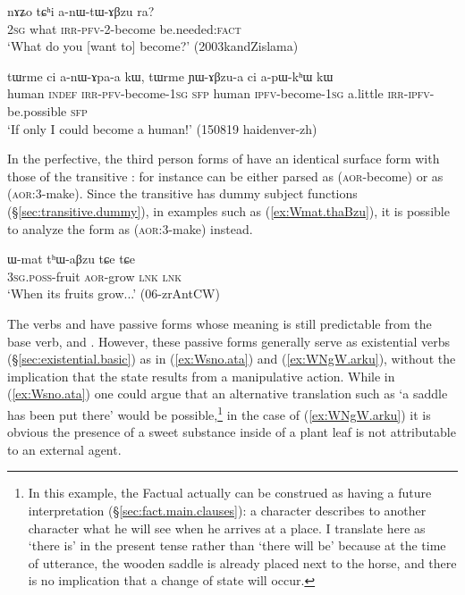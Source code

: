  \begin{exe}
\ex \label{ex:anWtABzu}
 \gll nɤʑo tɕʰi a-nɯ-tɯ-ɤβzu ra? \\
 \textsc{2sg} what \textsc{irr}-\textsc{pfv}-2-become be.needed:\textsc{fact} \\
 \glt `What do you [want to] become?' (2003kandZislama)
\end{exe}

 \begin{exe}
\ex \label{ex:anApa}
 \gll tɯrme ci a-nɯ-ɤpa-a kɯ, tɯrme ɲɯ-ɤβzu-a ci a-pɯ-kʰɯ kɯ \\
 human \textsc{indef} \textsc{irr}-\textsc{pfv}-become-\textsc{1sg} \textsc{sfp} human \textsc{ipfv}-become-\textsc{1sg} a.little \textsc{irr}-\textsc{ipfv}-be.possible \textsc{sfp} \\
 \glt `If only I could become a human!' (150819 haidenver-zh)
 \end{exe}
 
In the perfective, the third person forms of   have an identical surface form with those of the transitive : for instance  can be either parsed as  (\textsc{aor}-become) or as  (\textsc{aor}:3\flobv{}-make). Since the transitive  has dummy subject functions (§\ref{sec:transitive.dummy}), in examples such as (\ref{ex:Wmat.thaBzu}), it is possible to analyze  the form  as    (\textsc{aor}:3\flobv{}-make) instead.
 
\begin{exe}
\ex \label{ex:Wmat.thaBzu}
 \gll ɯ-mat tʰɯ-aβzu tɕe tɕe \\
 \textsc{3sg}.\textsc{poss}-fruit \textsc{aor}-grow \textsc{lnk} \textsc{lnk} \\
 \glt `When its fruits grow...' (06-zrAntCW) 
\end{exe}
  
The verbs  and  have passive forms whose meaning is still predictable from the base verb,    and .  However, these passive forms generally serve as existential verbs (§\ref{sec:existential.basic}) as in (\ref{ex:Wsno.ata}) and (\ref{ex:WNgW.arku}), without the implication that the state results from a manipulative action. While in (\ref{ex:Wsno.ata}) one could argue that an alternative translation such as `a saddle has been put there' would be possible,\footnote{In this example, the Factual actually can be construed as having a future interpretation (§\ref{sec:fact.main.clauses}): a character describes to another character what he will see when he arrives at a place. I translate here  as `there is' in the present tense rather than `there will be' because at the time of utterance, the wooden saddle is already placed next to the horse, and there is no implication that a change of state will occur. }  in the case of (\ref{ex:WNgW.arku}) it is obvious the presence of a sweet substance inside of a plant leaf is not attributable to an external agent. 
 
